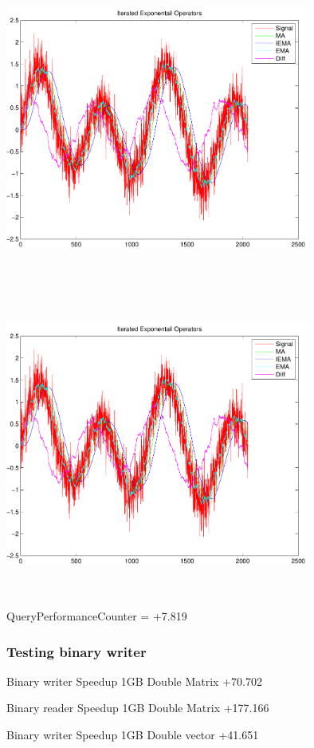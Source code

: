 \documentclass[9pt]{article}
\theoremstyle{plain}
\theoremstyle{definition}
\theoremstyle{remark}
\numberwithin{equation}{section}
\begin{document}
\includegraphics[width=10.0cm,height=10.0cm]{IteratedExponentailOperators.pdf}

\includegraphics[width=10.0cm,height=10.0cm]{IteratedExponentailOperators.pdf}

QueryPerformanceCounter  =  +7.819
\subsubsection{Testing binary writer}
Binary writer Speedup 1GB Double Matrix +70.702

Binary reader Speedup 1GB Double Matrix +177.166

Binary writer Speedup 1GB Double vector +41.651
\end{document}
